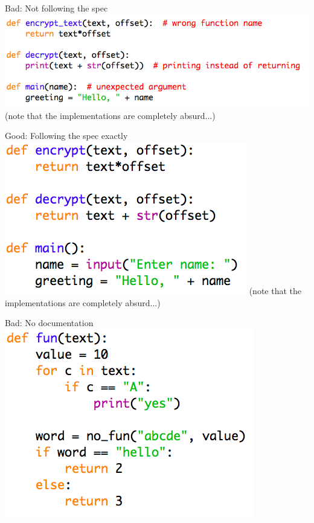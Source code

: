 \documentclass[week2]{csse1001}
\begin{document}
\begin{topic}{Bad: Not following the spec}
\includegraphics[scale=1]{bad_python/incorrect}
(note that the implementations are completely absurd...)
\end{topic}

\begin{topic}{Good: Following the spec exactly}
\includegraphics[scale=1]{bad_python/correct}
(note that the implementations are completely absurd...)
\end{topic}

\begin{topic}{Bad: No documentation}
\includegraphics[scale=1]{bad_python/no_comments}
\end{topic}
\end{document}
